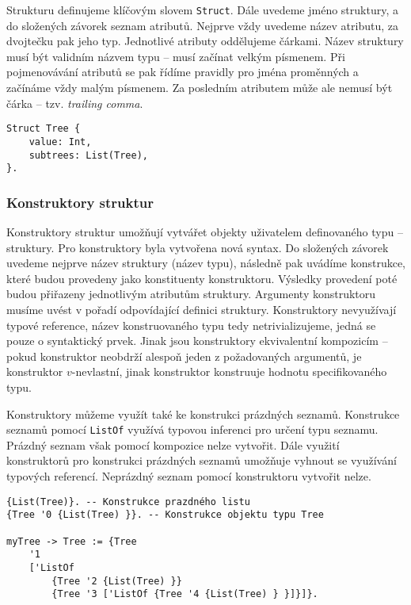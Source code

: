 Strukturu definujeme klíčovým slovem \lstinline{Struct}. Dále uvedeme jméno struktury, a do
složených závorek seznam atributů. Nejprve vždy uvedeme název atributu, za dvojtečku pak jeho typ.
Jednotlivé atributy oddělujeme čárkami. Název struktury musí být validním názvem typu -- musí
začínat velkým písmenem. Při pojmenovávání atributů se pak řídíme pravidly pro jména proměnných
a začínáme vždy malým písmenem. Za posledním atributem může ale nemusí být čárka -- tzv.
\textit{trailing comma}.

\begin{lstlisting}[caption={Příklad definice struktury}]
Struct Tree {
    value: Int,
    subtrees: List(Tree),
}.
\end{lstlisting}

\subsubsection{Konstruktory struktur}

Konstruktory struktur umožňují vytvářet objekty uživatelem definovaného typu -- struktury.
Pro konstruktory byla vytvořena nová syntax. Do složených závorek uvedeme nejprve název struktury
(název typu), následně pak uvádíme konstrukce, které budou provedeny jako konstituenty konstruktoru.
Výsledky provedení poté budou přiřazeny jednotlivým atributům struktury. Argumenty konstruktoru
musíme uvést v pořadí odpovídající definici struktury. Konstruktory nevyužívají typové reference,
název konstruovaného typu tedy netrivializujeme, jedná se pouze o syntaktický prvek. Jinak jsou
konstruktory ekvivalentní kompozicím -- pokud konstruktor neobdrží alespoň jeden z požadovaných
argumentů, je konstruktor $v$-nevlastní, jinak konstruktor konstruuje hodnotu specifikovaného typu.

Konstruktory můžeme využít také ke konstrukci prázdných seznamů. Konstrukce seznamů pomocí
\lstinline{ListOf} využívá typovou inferenci pro určení typu seznamu. Prázdný seznam však pomocí
kompozice nelze vytvořit. Dále využití konstruktorů pro konstrukci prázdných seznamů umožňuje
vyhnout se využívání typových referencí. Neprázdný seznam pomocí konstruktoru vytvořit nelze.

\begin{lstlisting}[caption={Příklad definice struktury},label=tree-creation]
{List(Tree)}. -- Konstrukce prazdného listu
{Tree '0 {List(Tree) }}. -- Konstrukce objektu typu Tree

myTree -> Tree := {Tree
    '1
    ['ListOf 
        {Tree '2 {List(Tree) }}
        {Tree '3 ['ListOf {Tree '4 {List(Tree) } }]}]}.
\end{lstlisting}

